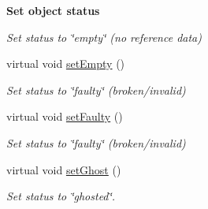 \begin{Indent}{\bf Set object status}\par
{\em Set status to \char`\"{}empty\char`\"{} (no reference data) }\begin{DoxyCompactItemize}
\item 
virtual void \hyperlink{classAnalysis_1_1FastJet_1_1UserInfo_ab87ca9e42c15c24c8f54bad4b9674d0c}{set\+Empty} ()
\begin{DoxyCompactList}\small\item\em Set status to \char`\"{}faulty\char`\"{} (broken/invalid) \end{DoxyCompactList}\item 
virtual void \hyperlink{classAnalysis_1_1FastJet_1_1UserInfo_a0c5efdcfb658e75538dd5ec29c27afe0}{set\+Faulty} ()
\begin{DoxyCompactList}\small\item\em Set status to \char`\"{}faulty\char`\"{} (broken/invalid) \end{DoxyCompactList}\item 
virtual void \hyperlink{classAnalysis_1_1FastJet_1_1UserInfo_ab22ff88713e1ad12bd2311cc4f1c998c}{set\+Ghost} ()
\begin{DoxyCompactList}\small\item\em Set status to \char`\"{}ghosted\char`\"{}. \end{DoxyCompactList}\end{DoxyCompactItemize}
\end{Indent}
